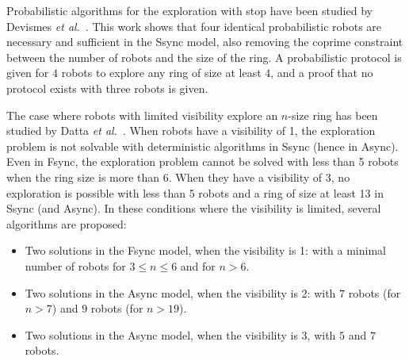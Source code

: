  Probabilistic algorithms for the exploration with stop have been studied by Devismes \textit{et al.}~\cite{devismes_optimal_2010-1}.
 This work shows that four identical probabilistic robots are necessary and sufficient in the Ssync model, also removing the coprime constraint between the number of robots and the size of the ring.  A probabilistic protocol is given for $4$ robots to explore any ring of size at least $4$, and a proof that no protocol exists with three robots is given.
 
 The case where robots with limited visibility explore an $n$-size ring has been studied by Datta \textit{et al.}~\cite{DattaLLP13}.
When robots have a visibility of 1, the exploration problem is not solvable with deterministic algorithms in Ssync (hence in Async). Even in Fsync, the exploration problem cannot be solved with less than 5 robots when the ring size is more than 6. 
 When they have a visibility of 3, no exploration is possible with less than 5 robots and a ring of size at least 13 in Ssync (and Async).
 In these conditions where the visibility is limited, several algorithms are proposed: 
 \begin{itemize}
 \item Two solutions in the Fsync model, when the visibility is 1: with a minimal number of robots for $3 \leq n \leq 6$ and for $n > 6$.
 \item Two solutions in the Async model, when the visibility is 2: with $7$ robots (for $n > 7$) and $9$ robots (for $n >19$).
 \item  Two solutions in the Async model, when the visibility is 3, with $5$ and $7$ robots.
 \end{itemize}


